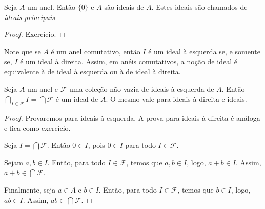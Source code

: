 \begin{prop}Seja $A$ um anel. Então $\{0\}$ e $A$ são ideais de $A$. Estes ideais são chamados de \emph{ideais principais}
\end{prop}
\begin{proof}
    Exercício.
\end{proof}

Note que se $A$ é um anel comutativo, então $I$ é um ideal à esquerda se, e somente se, $I$ é um ideal à direita. Assim, em anéis comutativos, a noção de ideal é equivalente à de ideal à esquerda ou à de ideal à direita.

\begin{prop}
    Seja $A$ um anel e $\mathcal F$ uma coleção não vazia de ideais à esquerda de $A$. Então $\bigcap_{I \in \mathcal F}I=\bigcap \mathcal F$ é um ideal de $A$. O mesmo vale para ideais à direita e ideais.
\end{prop}
\begin{proof}
    Provaremos para ideais à esquerda. A prova para ideais à direita é análoga e fica como exercício.

    Seja $I=\bigcap \mathcal F$. Então $0 \in I$, pois $0 \in I$ para todo $I \in \mathcal F$.

    Sejam $a, b \in I$. Então, para todo $I \in \mathcal F$, temos que $a, b \in I$, logo, $a+b\in I$. Assim, $a+b\in \bigcap \mathcal F$.

    Finalmente, seja $a \in A$ e $b \in I$. Então, para todo $I \in \mathcal F$, temos que $b \in I$, logo, $ab\in I$. Assim, $ab\in \bigcap \mathcal F$.
\end{proof}

